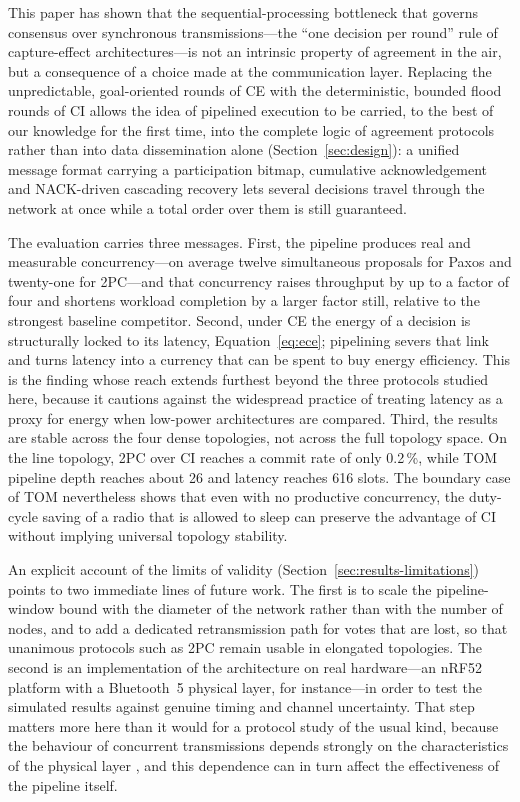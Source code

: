 \documentclass[journal]{IEEEtran}
\newcommand{\CI}{CI}                      %
\newcommand{\CE}{CE}                      %
\begin{document}
This paper has shown that the sequential-processing bottleneck that
governs consensus over synchronous transmissions---the ``one decision per
round'' rule of capture-effect architectures---is not an intrinsic
property of agreement in the air, but a consequence of a choice made at
the communication layer. Replacing the unpredictable, goal-oriented
rounds of \CE{} with the deterministic, bounded flood rounds of \CI{}
allows the idea of pipelined execution to be carried, to the best of our
knowledge for the first time, into the complete logic of agreement
protocols rather than into data dissemination alone
(Section~\ref{sec:design}): a unified message format carrying a
participation bitmap, cumulative acknowledgement and NACK-driven
cascading recovery lets several decisions travel through the network at
once while a total order over them is still guaranteed.

The evaluation carries three messages. First, the pipeline produces real
and measurable concurrency---on average twelve simultaneous proposals for
Paxos and twenty-one for 2PC---and that concurrency raises throughput by up to
a factor of four and shortens workload completion by a larger factor
still, relative to the strongest baseline competitor. Second, under \CE{}
the energy of a decision is structurally locked to its latency,
Equation~\eqref{eq:ece}; pipelining severs that link and turns latency
into a currency that can be spent to buy energy efficiency. This is the
finding whose reach extends furthest beyond the three protocols studied
here, because it cautions against the widespread practice of treating
latency as a proxy for energy when low-power architectures are compared.
Third, the results are stable across the four dense topologies, not across
the full topology space. On the line topology, 2PC over \CI{} reaches a
commit rate of only 0.2\,\%, while TOM pipeline depth reaches about 26 and
latency reaches 616 slots. The boundary case of TOM nevertheless shows that
even with no productive concurrency, the duty-cycle saving of a radio that
is allowed to sleep can preserve the advantage of \CI{} without implying
universal topology stability.

An explicit account of the limits of validity
(Section~\ref{sec:results-limitations}) points to two immediate lines of
future work. The first is to scale the pipeline-window bound with the
diameter of the network rather than with the number of nodes, and to add
a dedicated retransmission path for votes that are lost, so that
unanimous protocols such as 2PC remain usable in elongated topologies.
The second is an implementation of the architecture on real
hardware---an nRF52 platform with a Bluetooth~5 physical layer, for
instance---in order to test the simulated results against genuine timing
and channel uncertainty. That step matters more here than it would for a
protocol study of the usual kind, because the behaviour of concurrent
transmissions depends strongly on the characteristics of the physical
layer \cite{baddeley20phy}, and this dependence can in turn affect the
effectiveness of the pipeline itself.
\end{document}
